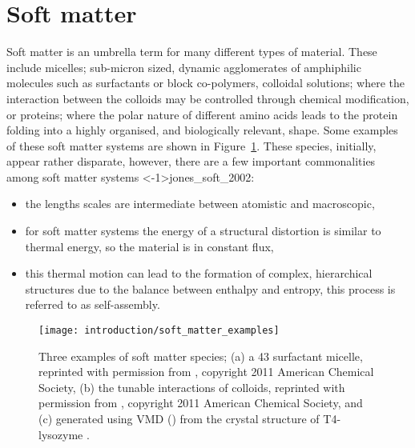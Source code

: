 \section{Soft matter}
Soft matter is an umbrella term for many different types of material.
These include micelles; sub-micron sized, dynamic agglomerates of amphiphilic molecules such as surfactants or block co-polymers, colloidal solutions; where the interaction between the colloids may be controlled through chemical modification, or proteins; where the polar nature of different amino acids leads to the protein folding into a highly organised, and biologically relevant, shape.
Some examples of these soft matter systems are shown in Figure~\ref{fig:soft}.
These species, initially, appear rather disparate, however, there are a few important commonalities among soft matter systems \sidecite<-1\baselineskip>{jones_soft_2002}:
\begin{itemize}
  \item the lengths scales are intermediate between atomistic and macroscopic,
  \item for soft matter systems the energy of a structural distortion is similar to thermal energy, so the material is in constant flux,
  \item this thermal motion can lead to the formation of complex, hierarchical structures due to the balance between enthalpy and entropy, this process is referred to as self-assembly.
\end{itemize}
%
\begin{figure}[t]
    \forceversofloat
    \centering
    \texttt{[image: introduction/soft\_matter\_examples]}
    \caption{Three examples of soft matter species; (a) a 43  surfactant micelle, reprinted with permission from \cite{hargreaves_atomistic_2011}, copyright 2011 American Chemical Society, (b) the tunable interactions of colloids, reprinted with permission from \cite{kraft_patchy_2011}, copyright 2011 American Chemical Society, and (c) generated using VMD (\cite{humphrey_vmd_1996}) from the crystal structure of T4-lysozyme \cite{rose_crystal_1988}.}
    \label{fig:soft}
\end{figure}
%

